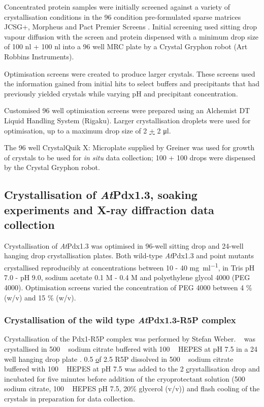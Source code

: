 Concentrated protein samples were initially screened against a variety of crystallisation conditions in the 96 condition pre-formulated sparse matrices JCSG+, Morpheus and Pact Premier Screens \cite{Newman2005,Gorrec2009}. Initial screening used sitting drop vapour diffusion with the screen and protein dispensed with a minimum drop size of 100 \si{\nano\litre} + 100 \si{\nano\litre} into a 96 well MRC plate by a Crystal Gryphon robot (Art Robbins Instruments).

Optimisation screens were created to produce larger crystals. These screens used the information gained from initial hits to select buffers and precipitants that had previously yielded crystals while varying pH and precipitant concentration. 

Customised 96 well optimisation screens were prepared using an Alchemist DT Liquid Handling System (Rigaku). Larger crystallisation droplets were used for optimisation, up to a maximum drop size of 2 \ul + 2 \si{\micro\litre}. 

The 96 well CrystalQuik X: Microplate supplied by Greiner was used for growth of crystals to be used for \textit{in situ} data collection; 100 \nl + 100 \nl drops were dispensed by the Crystal Gryphon robot. 
 
\subsection{Crystallisation of \textit{At}Pdx1.3, soaking experiments and X-ray diffraction data collection}
Crystallisation of \textit{At}Pdx1.3 was optimised in 96-well sitting drop and 24-well hanging drop crystallisation plates. Both wild-type \textit{At}Pdx1.3 and point mutants crystallised reproducibly at concentrations between 10 \mgml - 40 \si{\milli\gram\per\milli\litre}, in Tris pH 7.0 - pH 9.0, sodium acetate 0.1 M - 0.4 M and polyethylene glycol 4000 (PEG 4000). Optimisation screens varied the concentration of PEG 4000 between 4 \% (w/v) and 15 \% (w/v).
		
\subsubsection{Crystallisation of the wild type \textit{At}Pdx1.3-R5P complex}
Crystallisation of the Pdx1-R5P complex was performed by Stefan Weber. \atpdx~ was crystallised in 500 \si{\milli\molar} sodium citrate buffered with 100 \si{\milli\molar} HEPES at pH 7.5 in a 24 well hanging drop plate \cite{Weber2008}. 0.5 \ul of 2.5 \mM R5P dissolved in 500 \si{\milli\molar} sodium citrate buffered with 100 \si{\milli\molar} HEPES at pH 7.5 was added to the 2 \ul crystallisation drop and incubated for five minutes before addition of the cryoprotectant solution (500 \si{\milli\molar} sodium citrate, 100 \si{\milli\molar} HEPES pH 7.5, 20\% glycerol (v/v)) and flash cooling of the crystals in preparation for data collection. 

